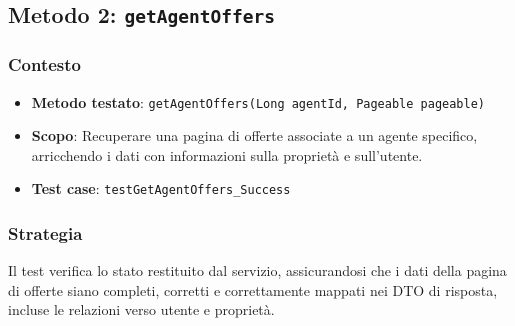 \documentclass{book}
\begin{document}
\subsection{Metodo 2: \texttt{getAgentOffers}}

\subsubsection{Contesto}
\begin{itemize}
\item \textbf{Metodo testato}: \texttt{getAgentOffers(Long agentId, Pageable pageable)}
\item \textbf{Scopo}: Recuperare una pagina di offerte associate a un agente specifico, arricchendo i dati con informazioni sulla proprietà e sull’utente.
\item \textbf{Test case}: \texttt{testGetAgentOffers\_Success}
\end{itemize}

\subsubsection{Strategia}
Il test verifica lo stato restituito dal servizio, assicurandosi che i dati della pagina di offerte siano completi, corretti e correttamente mappati nei DTO di risposta, incluse le relazioni verso utente e proprietà.
\end{document}
